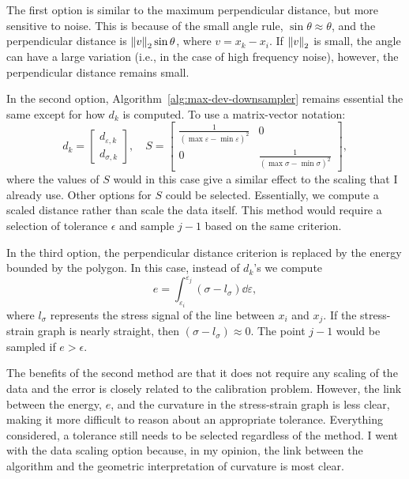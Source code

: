 \documentclass[a4paper,11pt]{article}
\begin{document}
The first option is similar to the maximum perpendicular distance, but more sensitive to noise.
This is because of the small angle rule, $\sin \theta \approx \theta$, and the perpendicular distance is $\norm{v}_2 \sin \theta$, where $v = x_k - x_i$.
If $\norm{v}_2$ is small, the angle can have a large variation (i.e., in the case of high frequency noise), however, the perpendicular distance remains small.

In the second option, Algorithm~\ref{alg:max-dev-downsampler} remains essential the same except for how $d_k$ is computed.
To use a matrix-vector notation:
\begin{equation*}
    d_k = \begin{bmatrix}
        d_{\varepsilon,k} \\
        d_{\sigma,k}
    \end{bmatrix}, \quad
    S = \begin{bmatrix}
        \frac{1}{(\max \varepsilon - \min \varepsilon)^2} & 0 \\
        0 & \frac{1}{(\max \sigma - \min \sigma)^2}
    \end{bmatrix},
\end{equation*}
where the values of $S$ would in this case give a similar effect to the scaling that I already use.
Other options for $S$ could be selected.
Essentially, we compute a scaled distance rather than scale the data itself.
This method would require a selection of tolerance $\epsilon$ and sample $j-1$ based on the same criterion.

In the third option, the perpendicular distance criterion is replaced by the energy bounded by the polygon.
In this case, instead of $d_k$'s we compute
\begin{equation*}
    e = \int_{\varepsilon_i}^{\varepsilon_j} (\sigma - l_\sigma) \dd \varepsilon,
\end{equation*}
where $l_\sigma$ represents the stress signal of the line between $x_i$ and $x_j$.
If the stress-strain graph is nearly straight, then $(\sigma - l_\sigma) \approx 0$.
The point $j-1$ would be sampled if $e > \epsilon$.

The benefits of the second method are that it does not require any scaling of the data and the error is closely related to the calibration problem.
However, the link between the energy, $e$, and the curvature in the stress-strain graph is less clear, making it more difficult to reason about an appropriate tolerance.
Everything considered, a tolerance still needs to be selected regardless of the method.
I went with the data scaling option because, in my opinion, the link between the algorithm and the geometric interpretation of curvature is most clear.
\end{document}
